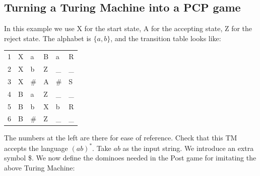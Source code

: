 \subsection{Turning a Turing Machine into a PCP game}

In this example we use X for the start state, A for the accepting
state, Z for the reject state. The alphabet is $\{a,b\}$, and the
transition table looks like:

\begin{center}
\begin{tabular}{|r||l|l||l|l|l|}
\hline
1 & X & a & B & a & R \\
2 & X & b & Z & \_ & \_ \\
3 & X & \# & A & \# & S \\
4 & B & a  & Z & \_ & \_ \\
5 & B & b  & X & b  & R  \\
6 & B & \# & Z & \_ & \_ \\
\hline
\end{tabular}
\end{center}

The numbers at the left are there for ease of reference. Check that
this TM accepts the language $(ab)^*$. Take $ab$ as the input string.
%
We introduce an extra symbol \$. We now define the dominoes needed in
the Post game for imitating the above Turing Machine:

